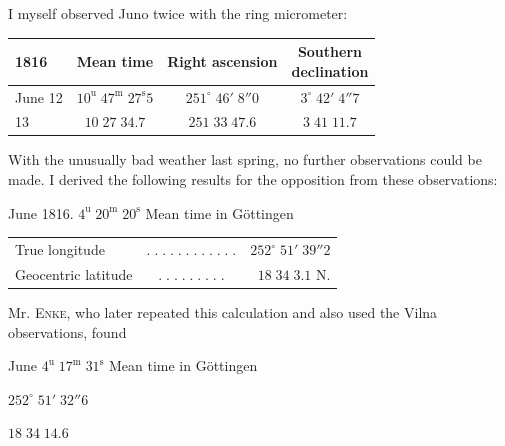 \par\indent I myself observed Juno twice with the ring micrometer:
\begin{center}\fontsize{10}{12}\selectfont\setlength{\tabcolsep}{5pt}\begin{tabular}{l|c|c|c}
1816 & Mean time & Right ascension & \shortstack{Southern\\declination}\\\hline
June 12 & $10^{\mathrm u}\;47^{\mathrm m}\;27^{\mathrm s}5$ & $251^\circ\;46'\;8''0$ & $3^\circ\;42'\;4''7$\\
13 & $10\;27\;34.7$ & $251\;33\;47.6$ & $3\;41\;11.7$\\
\end{tabular}\end{center}

\par\indent With the unusually bad weather last spring, no further observations could be made. I derived the following results for the opposition from these observations:
\begin{center}\fontsize{10}{12} June 1816. $4^{\mathrm u}\;20^{\mathrm m}\;20^{\mathrm s}$ Mean time in Göttingen\par
\setlength{\tabcolsep}{3pt}\begin{tabular}{lcr}
True longitude & $.\;.\;.\;.\;.\;.\;.\;.\;.\;.\;.\;.$ & $252^\circ\;51'\;39''2$\\
Geocentric latitude & $.\;.\;.\;.\;.\;.\;.\;.\;.$ & $18\;34\;3.1$ N.\\
\end{tabular}\end{center}

\par\indent Mr. \textsc{Enke}, who later repeated this calculation and also used the Vilna observations, found
\begin{center}\fontsize{10}{12} June \quad $4^{\mathrm u}\;17^{\mathrm m}\;31^{\mathrm s}$ \quad Mean time in Göttingen\par
$252^\circ\;51'\;32''6$\par
$18\;34\;14.6$
\end{center}

